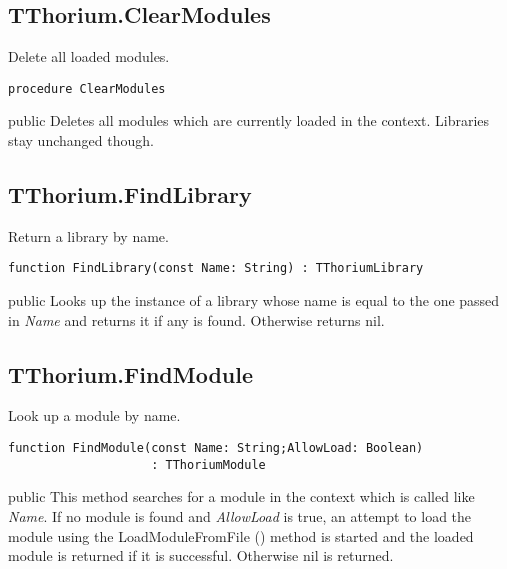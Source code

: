 \subsection{TThorium.ClearModules}
\label{thoriumcorepkg:thorium:tthorium:clearmodules}
\begin{FPCList}
\Synopsis
Delete all loaded modules.\Declaration 

\begin{verbatim}
procedure ClearModules
\end{verbatim}
\Visibility
public
\Description
Deletes all modules which are currently loaded in the context. Libraries stay unchanged though.\end{FPCList}
\subsection{TThorium.FindLibrary}
\label{thoriumcorepkg:thorium:tthorium:findlibrary}
\begin{FPCList}
\Synopsis
Return a library by name.\Declaration 

\begin{verbatim}
function FindLibrary(const Name: String) : TThoriumLibrary
\end{verbatim}
\Visibility
public
\Description
Looks up the instance of a library whose name is equal to the one passed in \textit{Name} and returns it if any is found. Otherwise returns nil.\end{FPCList}
\subsection{TThorium.FindModule}
\label{thoriumcorepkg:thorium:tthorium:findmodule}
\begin{FPCList}
\Synopsis
Look up a module by name.\Declaration 

\begin{verbatim}
function FindModule(const Name: String;AllowLoad: Boolean)
                    : TThoriumModule
\end{verbatim}
\Visibility
public
\Description
This method searches for a module in the context which is called like \textit{Name}. If no module is found and \textit{AllowLoad} is true, an attempt to load the module using the LoadModuleFromFile (\pageref{thoriumcorepkg:thorium:tthorium:loadmodulefromfile}) method is started and the loaded module is returned if it is successful. Otherwise nil is returned.\end{FPCList}
